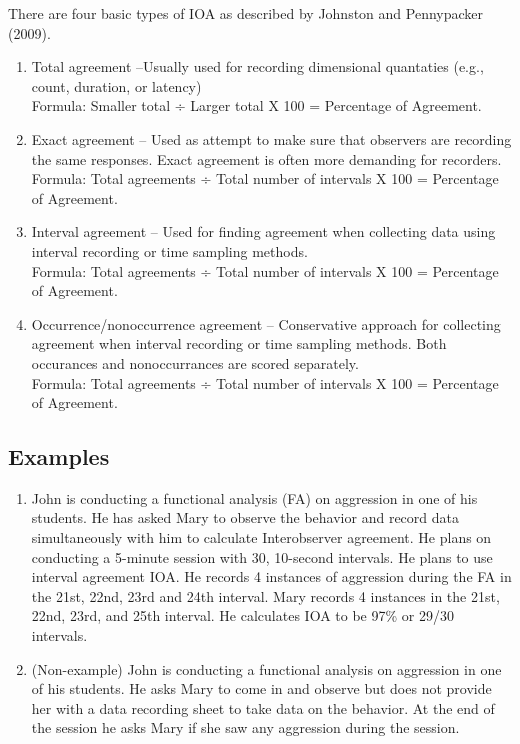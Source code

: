 There are four basic types of IOA as described by Johnston and Pennypacker (2009).
\begin{enumerate}
\item Total agreement –Usually used for recording dimensional quantaties (e.g., count, duration, or latency)\\  Formula: Smaller total ÷ Larger total X 100 = Percentage of Agreement.
\item Exact agreement – Used as attempt to make sure that observers are recording the same responses. Exact agreement is often more demanding for recorders.\\
Formula: Total agreements ÷ Total number of intervals X 100 = Percentage of Agreement.
\item Interval agreement – Used for finding agreement when collecting data using interval recording or time sampling methods.\\
Formula: Total agreements ÷ Total number of intervals X 100 = Percentage of Agreement.
\item Occurrence/nonoccurrence agreement – Conservative approach for collecting agreement when interval recording or time sampling methods. Both occurances and nonoccurrances are scored separately.\\
Formula: Total agreements ÷ Total number of intervals X 100 = Percentage of Agreement.
\end{enumerate}
%
\subsection{Examples}
\begin{enumerate}
\item John is conducting a functional analysis (FA) on aggression in one of his students. He has asked Mary to observe the behavior and record data simultaneously with him to calculate Interobserver agreement. He plans on conducting a 5-minute session with 30, 10-second intervals. He plans to use interval agreement IOA.  He records 4 instances of aggression during the FA in the 21st, 22nd, 23rd and 24th interval. Mary records 4 instances in the 21st, 22nd, 23rd, and 25th interval. He calculates IOA to be 97\% or 29/30 intervals.
\item (Non-example) John is conducting a functional analysis on aggression in one of his students. He asks Mary to come in and observe but does not provide her with a data recording sheet to take data on the behavior. At the end of the session he asks Mary if she saw any aggression during the session. 
\end{enumerate}
%
